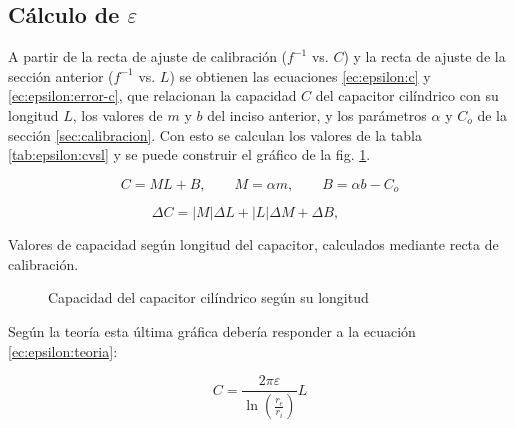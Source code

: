 \subsection{Cálculo de $\varepsilon$}

A partir de la recta de ajuste de calibración ($f^{-1}$ vs. $C$) y la recta de
ajuste de la sección anterior ($f^{-1}$ vs. $L$) se obtienen las ecuaciones
\ref{ec:epsilon:c} y \ref{ec:epsilon:error-c}, que relacionan la capacidad $C$
del capacitor cilíndrico con su longitud $L$, los valores de $m$ y $b$ del
inciso anterior, y los parámetros $\alpha$ y $C_o$ de la sección
\ref{sec:calibracion}. Con esto se calculan los valores de la tabla
\ref{tab:epsilon:cvsl} y se puede construir el gráfico de la fig.
\ref{fig:epsilon:cvsl}.

\begin{equation}
    \label{ec:epsilon:c}
    C = ML + B,\quad\quad
    M = \alpha m, \quad\quad
    B = \alpha b - C_o
\end{equation}

\begin{equation}
    \label{ec:epsilon:error-c}
    \Delta C = \left| M \right| \Delta L 
             + \left| L \right| \Delta M
             + \Delta B, \quad\quad
\end{equation}

\begin{table}[H]
    \centering
    \caption{Valores de capacidad según longitud del capacitor, calculados
        mediante recta de calibración.}
    \label{tab:epsilon:cvsl}
\end{table}

\begin{figure}[H]
    \centering
    
    \caption{Capacidad del capacitor cilíndrico según su longitud}
    \label{fig:epsilon:cvsl}
\end{figure}

\vspace{10mm}
Según la teoría esta última gráfica debería responder a la ecuación 
\ref{ec:epsilon:teoria}:

\begin{equation}
    \label{ec:epsilon:teoria}
    C = \frac{2\pi\varepsilon}{\ln\left(\frac{r_e}{r_i}\right)} L
\end{equation}


